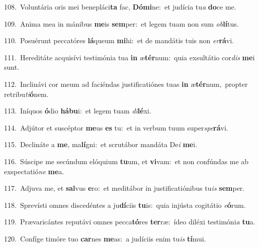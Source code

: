 {\numbfont\textcolor{\numbcolor}{108.}}~Voluntária oris mei benepláci\textbf{ta} fac, \textbf{Dó}\-\textbf{mi}ne:~\star et judícia tu\textit{a} \textbf{do}\-ce me.\par
{\numbfont\textcolor{\numbcolor}{109.}}~Anima mea in mánibus \textbf{me}\-is \textbf{sem}\-per:~\star et legem tuam non sum \textit{ob}\-\textbf{lí}tus.\par
{\numbfont\textcolor{\numbcolor}{110.}}~Posuérunt peccatóres \textbf{lá}\-queum \textbf{mi}\-hi:~\star et de mandátis tuis non \textit{er}\-\textbf{rá}vi.\par
{\numbfont\textcolor{\numbcolor}{111.}}~Hereditáte acquisívi testimónia tua \textbf{in} æ\-\textbf{tér}\-num:~\star quia exsultátio cor\textit{dis} \textbf{me}\-i sunt.\par
{\numbfont\textcolor{\numbcolor}{112.}}~Inclinávi cor meum ad faciéndas justificatiónes tuas \textbf{in} æ\-\textbf{tér}\-num,~\star propter retribu\-\textit{ti}\-\textbf{ó}nem.\par
{\numbfont\textcolor{\numbcolor}{113.}}~Iníquos \textbf{ó}\-dio \textbf{há}\-\textbf{bu}i:~\star et legem tuam \textit{di}\-\textbf{lé}xi.\par
{\numbfont\textcolor{\numbcolor}{114.}}~Adjútor et suscéptor \textbf{me}\-us \textbf{es} tu:~\star et in verbum tuum super\-\textit{spe}\-\textbf{rá}vi.\par
{\numbfont\textcolor{\numbcolor}{115.}}~Declináte a \textbf{me}\-, ma\-\textbf{lí}\-gni:~\star et scrutábor mandáta De\textit{i} \textbf{me}\-i.\par
{\numbfont\textcolor{\numbcolor}{116.}}~Súscipe me secúndum elóquium \textbf{tu}\-um, et \textbf{vi}\-vam:~\star et non confúndas me ab exspectatió\textit{ne} \textbf{me}\-a.\par
{\numbfont\textcolor{\numbcolor}{117.}}~Adjuva me, et \textbf{sal}\-vus \textbf{e}\-ro:~\star et meditábor in justificatiónibus tu\textit{is} \textbf{sem}\-per.\par
{\numbfont\textcolor{\numbcolor}{118.}}~Sprevísti omnes discedéntes a ju\-\textbf{dí}\-ciis \textbf{tu}\-is:~\star quia injústa cogitátio \textit{e}\-\textbf{ó}rum.\par
{\numbfont\textcolor{\numbcolor}{119.}}~Prævaricántes reputávi omnes pecca\-\textbf{tó}\-res \textbf{ter}\-ræ:~\star ídeo diléxi testimóni\textit{a} \textbf{tu}\-a.\par
{\numbfont\textcolor{\numbcolor}{120.}}~Confíge timóre tuo \textbf{car}\-nes \textbf{me}\-as:~\star a judíciis enim tu\textit{is} \textbf{tí}\-mui.\par
